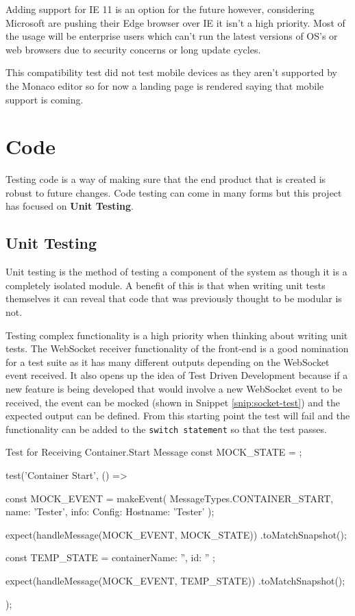 Adding support for IE 11 is an option for the future however, considering Microsoft are pushing their Edge browser over IE it isn't a high priority. Most of the usage will be enterprise users which can't run the latest versions of OS's or web browsers due to security concerns or long update cycles.

This compatibility test did not test mobile devices as they aren't supported by the Monaco editor so for now a landing page is rendered saying that mobile support is coming.

\section{Code}

Testing code is a way of making sure that the end product that is created is robust to future changes. Code testing can come in many forms but this project has focused on \textbf{Unit Testing}.

\subsection{Unit Testing} \label{test:unit}

Unit testing is the method of testing a component of the system as though it is a completely isolated module. A benefit of this is that when writing unit tests themselves it can reveal that code that was previously thought to be modular is not. 

Testing complex functionality is a high priority when thinking about writing unit tests. The WebSocket receiver functionality of the front-end is a good nomination for a test suite as it has many different outputs depending on the WebSocket event received. It also opens up the idea of Test Driven Development because if a new feature is being developed that would involve a new WebSocket event to be received, the event can be mocked (shown in Snippet \ref{snip:socket-test}) and the expected output can be defined. From this starting point the test will fail and the functionality can be added to the \texttt{switch statement} so that the test passes.

\begin{sexylisting}[label=snip:socket-test]{Test for Receiving Container.Start Message}
const MOCK_STATE = {};

test('Container Start', () => {
    const MOCK_EVENT = makeEvent(
        MessageTypes.CONTAINER_START, {
            name: 'Tester',
            info: { Config: { Hostname: 'Tester' } }
        });

    expect(handleMessage(MOCK_EVENT, MOCK_STATE))
        .toMatchSnapshot();

    const TEMP_STATE = { containerName: '', id: '' };

    expect(handleMessage(MOCK_EVENT, TEMP_STATE))
        .toMatchSnapshot();
});
\end{sexylisting}

